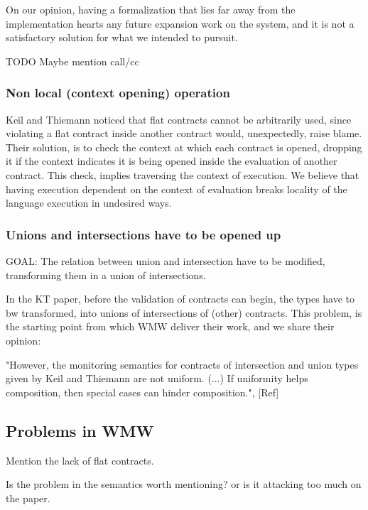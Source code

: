 On our opinion, having a formalization that lies far away from the implementation
hearts any future expansion work on the system, and it is not a satisfactory solution
for what we intended to pursuit.


TODO Maybe mention call/cc

\subsubsection{Non local (context opening) operation}

Keil and Thiemann noticed that flat contracts cannot be arbitrarily used, since
violating a flat contract inside another contract would, unexpectedly, raise blame.
Their solution, is to check the context at which each contract is opened, dropping
it if the context indicates it is being opened inside the evaluation of another
contract.
This check, implies traversing the context of execution. We believe that
having execution dependent on the context of evaluation breaks locality of
the language execution in undesired ways.

\subsubsection*{Unions and intersections have to be opened up}

GOAL: The relation between union and intersection have to be modified, transforming them
in a union of intersections.

In the KT paper, before the validation of contracts can begin, the types have to bw
transformed, into unions of intersections of (other) contracts. This problem,
is the starting point from which WMW deliver their work, and we share their opinion:

"However, the monitoring semantics for contracts of intersection and union types given by Keil
and Thiemann are not uniform. (...) If uniformity helps composition, then
special cases can hinder composition.", [Ref]

\subsection{Problems in WMW}

Mention the lack of flat contracts.

Is the problem in the semantics worth mentioning? or is it attacking too much on the paper.


